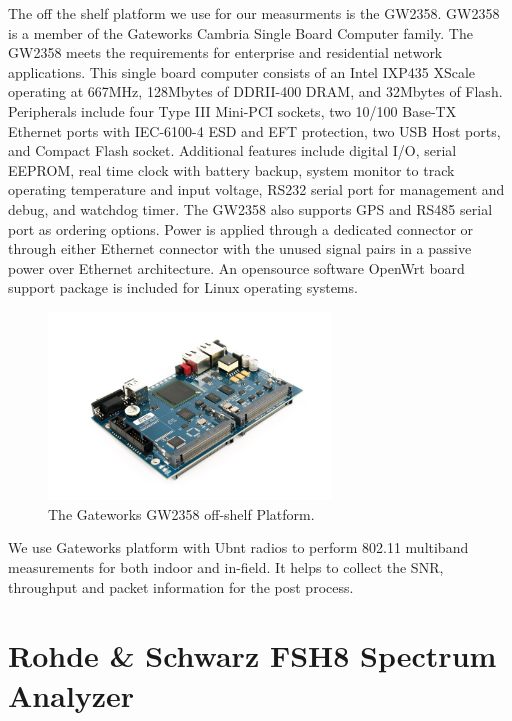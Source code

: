 The off the shelf platform we use for our measurments is the GW2358.
GW2358 is a member of the Gateworks Cambria Single Board Computer family. 
The GW2358 meets the requirements for enterprise and residential network 
applications. This single board computer consists of an Intel IXP435 XScale 
operating at 667MHz, 128Mbytes of DDRII-400 DRAM, and 32Mbytes of Flash. 
Peripherals include four Type III Mini-PCI sockets, two 10/100 Base-TX 
Ethernet ports with IEC-6100-4 ESD and EFT protection, two USB Host ports, 
and Compact Flash socket. Additional features include digital I/O, serial 
EEPROM, real time clock with battery backup, system monitor to track 
operating temperature and input voltage, RS232 serial port for management 
and debug, and watchdog timer. The GW2358 also supports GPS and RS485 
serial port as ordering options. Power is applied through a dedicated 
connector or through either Ethernet connector with the unused signal 
pairs in a passive power over Ethernet architecture. 
An opensource software OpenWrt board support package is included 
for Linux operating systems.


\begin{figure} 
\centering
\includegraphics[width=75mm]{figures/gw2358}
\vspace{-0.1in}
\caption{The Gateworks GW2358 off-shelf Platform.}
\label{fig:gw2358}
\vspace{0.1in}
\end{figure}

We use Gateworks platform with Ubnt radios to perform 802.11 multiband 
measurements for both indoor and in-field. It helps to collect 
the SNR, throughput and packet information for the post process. 



\section{Rohde \& Schwarz FSH8 Spectrum Analyzer}

